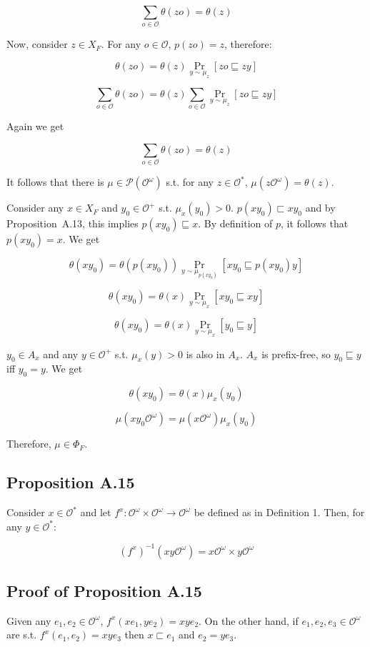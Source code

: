\documentclass[a4paper]{article}
\DeclareMathOperator{\Prb}{Pr}
\newcommand{\Prob}{\mathcal{P}}
\newcommand{\Obs}{\mathcal{O}}
\newcommand{\ObsO}{\Obs^\omega}
\begin{document}
$$\sum_{o \in \Obs} \theta(zo)=\theta(z)$$

Now, consider ${z \in X_F}$. For any ${o \in \Obs}$, ${p(zo)=z}$, therefore:

$$\theta(zo)=\theta(z)\Prb_{y \sim \mu_z}[zo \sqsubseteq zy]$$

$$\sum_{o \in \Obs} \theta(zo)=\theta(z) \sum_{o \in \Obs} \Prb_{y \sim \mu_z}[zo \sqsubseteq zy]$$

Again we get 

$$\sum_{o \in \Obs} \theta(zo)=\theta(z)$$

It follows that there is ${\mu \in \Prob(\ObsO)}$ s.t. for any ${z \in \Obs^*}$, ${\mu(z\ObsO)=\theta(z)}$.

Consider any ${x \in X_F}$ and ${y_0 \in \Obs^+}$ s.t. ${\mu_x(y_0) > 0}$. ${p(xy_0) \sqsubset xy_0}$ and by Proposition\ A.13, this implies ${p(xy_0) \sqsubseteq x}$. By definition of ${p}$, it follows that ${p(xy_0)=x}$. We get

$$\theta(xy_0)=\theta(p(xy_0)) \Prb_{y \sim \mu_{p(xy_0)}}[xy_0 \sqsubseteq p(xy_0)y]$$

$$\theta(xy_0)=\theta(x) \Prb_{y \sim \mu_x}[xy_0 \sqsubseteq xy]$$

$$\theta(xy_0)=\theta(x) \Prb_{y \sim \mu_x}[y_0 \sqsubseteq y]$$

${y_0 \in A_x}$ and any ${y \in \Obs^+}$ s.t. ${\mu_x(y) > 0}$ is also in ${A_x}$. ${A_x}$ is prefix-free, so ${y_0 \sqsubseteq y}$ iff ${y_0 = y}$. We get

$$\theta(xy_0)=\theta(x) \mu_x(y_0)$$

$$\mu(xy_0 \ObsO)=\mu(x\ObsO) \mu_x(y_0)$$

Therefore, ${\mu \in \Phi_F}$.

\subsection{Proposition A.15}

Consider ${x \in \Obs^*}$ and let ${f^x: \ObsO \times \ObsO \rightarrow \ObsO}$ be defined as in Definition 1. Then, for any ${y \in \Obs^*}$:

$${(f^x)^{-1}(xy\ObsO) = x\ObsO \times y\ObsO}$$

\subsection{Proof of Proposition A.15}

Given any ${e_1,e_2 \in \ObsO}$, ${f^x(xe_1,ye_2)=xye_2}$. On the other hand, if ${e_1,e_2,e_3 \in \ObsO}$ are s.t. ${f^x(e_1,e_2)=xye_3}$ then ${x \sqsubset e_1}$ and ${e_2=ye_3}$.
\end{document}
